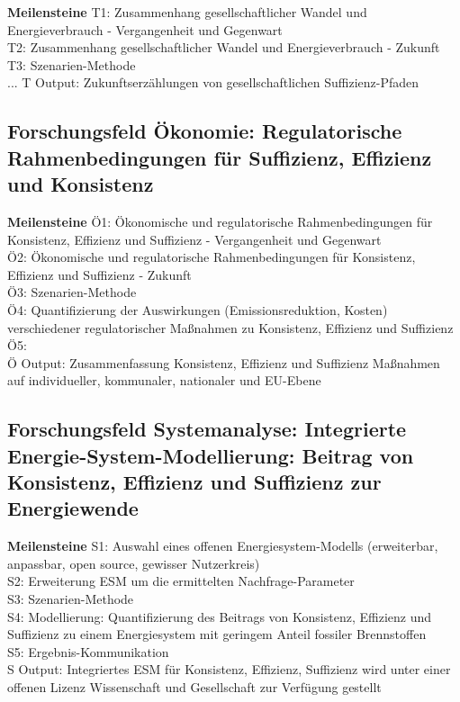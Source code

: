 \documentclass[a4paper,11pt,twoside]{scrartcl}
\begin{document}
\textbf{Meilensteine}
\hline
T1: Zusammenhang gesellschaftlicher Wandel und Energieverbrauch - Vergangenheit und Gegenwart\\
T2: Zusammenhang gesellschaftlicher Wandel und Energieverbrauch - Zukunft\\
T3: Szenarien-Methode\\
...
T Output: Zukunftserzählungen von gesellschaftlichen Suffizienz-Pfaden
\hline

\subsection*{Forschungsfeld Ökonomie: Regulatorische Rahmenbedingungen für Suffizienz, Effizienz und Konsistenz}

\textbf{Meilensteine}
\hline
Ö1: Ökonomische und regulatorische Rahmenbedingungen für Konsistenz, Effizienz und Suffizienz - Vergangenheit und Gegenwart\\
Ö2: Ökonomische und regulatorische Rahmenbedingungen für Konsistenz, Effizienz und Suffizienz - Zukunft\\
Ö3: Szenarien-Methode\\
Ö4: Quantifizierung der Auswirkungen (Emissionsreduktion, Kosten) verschiedener regulatorischer Maßnahmen zu Konsistenz, Effizienz und Suffizienz\\
Ö5: \\
Ö Output: Zusammenfassung Konsistenz, Effizienz und Suffizienz Maßnahmen auf individueller, kommunaler, nationaler und EU-Ebene
\hline

\subsection*{Forschungsfeld Systemanalyse: Integrierte Energie-System-Modellierung: Beitrag von Konsistenz, Effizienz und Suffizienz zur Energiewende}

\textbf{Meilensteine}
\hline
S1: Auswahl eines offenen Energiesystem-Modells (erweiterbar, anpassbar, open source, gewisser Nutzerkreis)\\
S2: Erweiterung ESM um die ermittelten Nachfrage-Parameter\\
S3: Szenarien-Methode\\
S4: Modellierung: Quantifizierung des Beitrags von Konsistenz, Effizienz und Suffizienz zu einem Energiesystem mit geringem Anteil fossiler Brennstoffen\\
S5: Ergebnis-Kommunikation\\
S Output: Integriertes ESM für Konsistenz, Effizienz, Suffizienz wird unter einer offenen Lizenz Wissenschaft und Gesellschaft zur Verfügung gestellt
\hline
\end{document}
